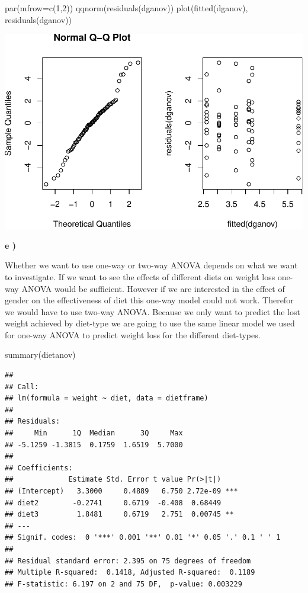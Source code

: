\documentclass[
]{article}
\newenvironment{Shaded}{\begin{snugshade}}{\end{snugshade}}
\newcommand{\AttributeTok}[1]{\textcolor[rgb]{0.77,0.63,0.00}{#1}}
\newcommand{\DecValTok}[1]{\textcolor[rgb]{0.00,0.00,0.81}{#1}}
\newcommand{\FunctionTok}[1]{\textcolor[rgb]{0.00,0.00,0.00}{#1}}
\newcommand{\NormalTok}[1]{#1}
\begin{document}
\begin{Shaded}
\begin{Highlighting}[]
\FunctionTok{par}\NormalTok{(}\AttributeTok{mfrow=}\FunctionTok{c}\NormalTok{(}\DecValTok{1}\NormalTok{,}\DecValTok{2}\NormalTok{))}
\FunctionTok{qqnorm}\NormalTok{(}\FunctionTok{residuals}\NormalTok{(dganov))}
\FunctionTok{plot}\NormalTok{(}\FunctionTok{fitted}\NormalTok{(dganov), }\FunctionTok{residuals}\NormalTok{(dganov))}
\end{Highlighting}
\end{Shaded}

\includegraphics{assignment_1_files/figure-latex/unnamed-chunk-23-1.pdf}

\textbf{e )}

Whether we want to use one-way or two-way ANOVA depends on what we want
to investigate. If we want to see the effects of different diets on
weight loss one-way ANOVA would be sufficient. However if we are
interested in the effect of gender on the effectiveness of diet this
one-way model could not work. Therefor we would have to use two-way
ANOVA. Because we only want to predict the lost weight achieved by
diet-type we are going to use the same linear model we used for one-way
ANOVA to predict weight loss for the different diet-types.

\begin{Shaded}
\begin{Highlighting}[]
\FunctionTok{summary}\NormalTok{(dietanov)}
\end{Highlighting}
\end{Shaded}

\begin{verbatim}
## 
## Call:
## lm(formula = weight ~ diet, data = dietframe)
## 
## Residuals:
##     Min      1Q  Median      3Q     Max 
## -5.1259 -1.3815  0.1759  1.6519  5.7000 
## 
## Coefficients:
##             Estimate Std. Error t value Pr(>|t|)    
## (Intercept)   3.3000     0.4889   6.750 2.72e-09 ***
## diet2        -0.2741     0.6719  -0.408  0.68449    
## diet3         1.8481     0.6719   2.751  0.00745 ** 
## ---
## Signif. codes:  0 '***' 0.001 '**' 0.01 '*' 0.05 '.' 0.1 ' ' 1
## 
## Residual standard error: 2.395 on 75 degrees of freedom
## Multiple R-squared:  0.1418, Adjusted R-squared:  0.1189 
## F-statistic: 6.197 on 2 and 75 DF,  p-value: 0.003229
\end{verbatim}
\end{document}
